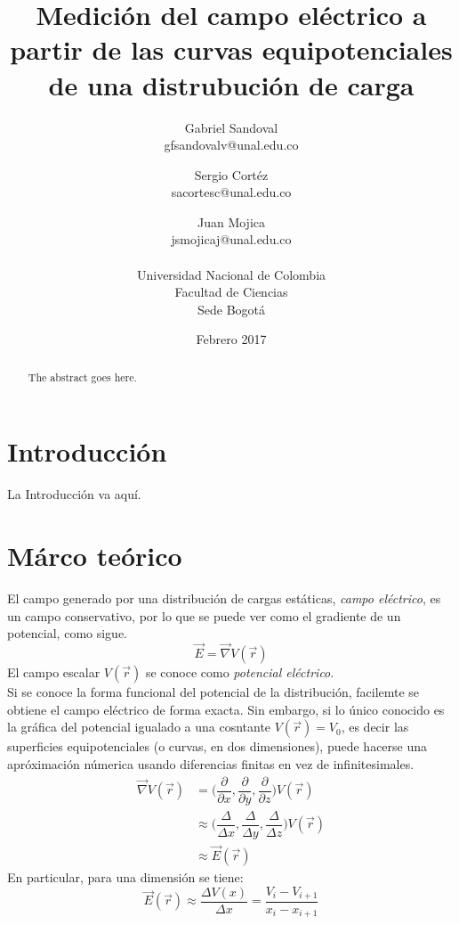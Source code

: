 \documentclass[10pt,twocolumn]{article}
\title{Medición del campo el\'ectrico a partir de las curvas equipotenciales de una distrubuci\'on de carga}
\author{Gabriel Sandoval \\ gfsandovalv@unal.edu.co \and Sergio Cortéz \\sacortesc@unal.edu.co \and Juan Mojica \\jsmojicaj@unal.edu.co\\ \\Universidad Nacional de Colombia\\Facultad de Ciencias \\ Sede Bogotá}
\date{Febrero 2017}
\begin{document}
\maketitle{}
\begin{abstract}
The abstract goes here.
\end{abstract}

\section{Introducción}
La Introducción va aquí.
\section{Márco teórico}
El campo generado por una distribución de cargas estáticas, \emph{campo eléctrico}, es un campo conservativo, por lo que se puede ver como el gradiente de un potencial, como sigue. \cite{griffiths}
\begin{equation}\label{gradiente}
  \vec{E}=\vec{\nabla}V(\vec{r})
\end{equation}
El campo escalar $V(\vec{r})$ se conoce como \emph{potencial eléctrico}.\\
Si se conoce la forma funcional del potencial de la distribución, facilemte se obtiene el campo eléctrico de forma exacta. Sin embargo, si lo único conocido es la gráfica del potencial igualado a una cosntante $V(\vec{r})=V_0$, es decir las superficies equipotenciales (o curvas, en dos dimensiones), puede hacerse una apróximación númerica usando diferencias finitas en vez de infinitesimales.
\begin{equation*}
  \begin{split}
    \vec{\nabla}V(\vec{r})&=\Big(\dfrac{\partial}{\partial x}, \dfrac{\partial}{\partial y},
    \dfrac{\partial}{\partial z}\Big) V(\vec{r})\\
    &\approx \Big(\dfrac{\Delta}{\Delta x}, \dfrac{\Delta}{\Delta y}, \dfrac{\Delta}{\Delta z}\Big) V(\vec{r})\\
    &\approx \vec{E}(\vec{r})
  \end{split}
\end{equation*}
En particular, para una dimensión se tiene:
\begin{equation}\label{1dimension}
\vec{E}(\vec{r}) \approx \dfrac{\Delta V(x)}{\Delta x}=\dfrac{V_i-V_{i+1}}{x_i-x_{i+1}}  
\end{equation}
\end{document}
